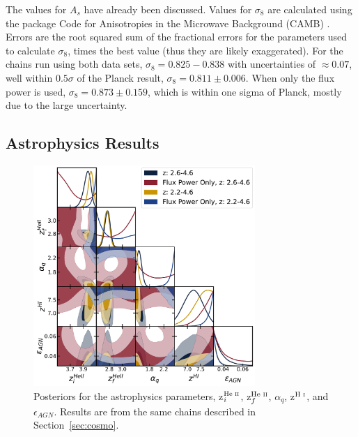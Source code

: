 \documentclass[a4paper,11pt]{article}
\begin{document}
The values for $A_s$ have already been discussed.
Values for $\sigma_8$ are calculated using the package Code for Anisotropies in the Microwave Background (CAMB) \cite{2011ascl.soft02026L}.
Errors are the root squared sum of the fractional errors for the parameters used to calculate $\sigma_8$, times the best value (thus they are likely exaggerated).
For the chains run using both data sets, $\sigma_8 = 0.825-0.838$ with uncertainties of $\approx0.07$, well within $0.5\sigma$ of the Planck result, $\sigma_8 = 0.811 \pm 0.006$.
When only the flux power is used, $\sigma_8=0.873\pm0.159$, which is within one sigma of Planck, mostly due to the large uncertainty.


\subsection{Astrophysics Results}\label{sec:astro}

\begin{figure}
    \centering
    \includegraphics[width=0.75\textwidth]{figures/astro_corner.pdf}
    \caption{\label{fig:astro_corner}
    Posteriors for the astrophysics parameters, z$^{\text{He~{\sc ii}}}_i$, z$^{\text{He~{\sc ii}}}_f$, $\alpha_q$, z$^{\text{H~{\sc i}}}$, and $\epsilon_{AGN}$.
    Results are from the same chains described in Section~\ref{sec:cosmo}.
    }
\end{figure}
\end{document}
